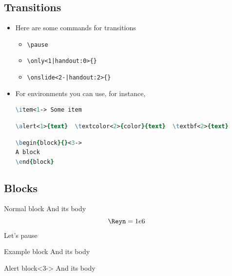 \documentclass[aspectratio=1610,11pt]{beamer}
\begin{document}
\subsection{Transitions}
\begin{frame}[fragile]{\insertsection}
    \begin{itemize}
        \item Here are some commands for transitions
        \begin{itemize}
            \item \verb|\pause|
            \item \verb!\only<1|handout:0>{}!
            \item \verb!\onslide<2-|handout:2>{}!
        \end{itemize}
        \item For environments you can use, for instance,
         \begin{lstlisting}[language=tcl,numbers=none]
\item<1-> Some item\end{lstlisting}
         \begin{lstlisting}[language=tcl,numbers=none]
\alert<1>{text}  \textcolor<2>{color}{text}  \textbf<2>{text}\end{lstlisting}
         \begin{lstlisting}[language=tcl,numbers=none]
\begin{block}{}<3->
A block
\end{block}\end{lstlisting}
    \end{itemize}
        
\end{frame}

\subsection{Blocks}
\begin{frame}{\insertsection}{\insertsubsection}  
    \begin{block}{Normal block}
    And its body
    $$ \Reyn= 1e6$$
    Let's pause 
    \end{block}
    \pause
    \begin{exampleblock}{Example block}
    And its body
    \end{exampleblock}
    \begin{alertblock}{Alert block}<3->
    And its body
    \end{alertblock}
\end{frame}
\end{document}
